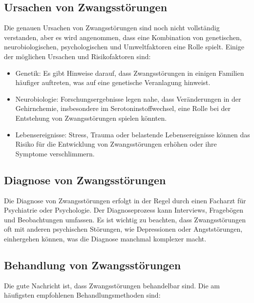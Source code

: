 \subsection{Ursachen von Zwangsstörungen}

Die genauen Ursachen von Zwangsstörungen sind noch nicht vollständig verstanden, aber es wird angenommen, dass eine Kombination von genetischen, neurobiologischen, psychologischen und Umweltfaktoren eine Rolle spielt. Einige der möglichen Ursachen und Risikofaktoren sind:

\begin{itemize}
  \item Genetik: Es gibt Hinweise darauf, dass Zwangsstörungen in einigen Familien häufiger auftreten, was auf eine genetische Veranlagung hinweist.
  
  \item Neurobiologie: Forschungsergebnisse legen nahe, dass Veränderungen in der Gehirnchemie, insbesondere im Serotoninstoffwechsel, eine Rolle bei der Entstehung von Zwangsstörungen spielen könnten.
  
  \item Lebensereignisse: Stress, Trauma oder belastende Lebensereignisse können das Risiko für die Entwicklung von Zwangsstörungen erhöhen oder ihre Symptome verschlimmern.
\end{itemize}

\subsection{Diagnose von Zwangsstörungen}

Die Diagnose von Zwangsstörungen erfolgt in der Regel durch einen Facharzt für Psychiatrie oder Psychologie. Der Diagnoseprozess kann Interviews, Fragebögen und Beobachtungen umfassen. Es ist wichtig zu beachten, dass Zwangsstörungen oft mit anderen psychischen Störungen, wie Depressionen oder Angststörungen, einhergehen können, was die Diagnose manchmal komplexer macht.

\subsection{Behandlung von Zwangsstörungen}

Die gute Nachricht ist, dass Zwangsstörungen behandelbar sind. Die am häufigsten empfohlenen Behandlungsmethoden sind:

